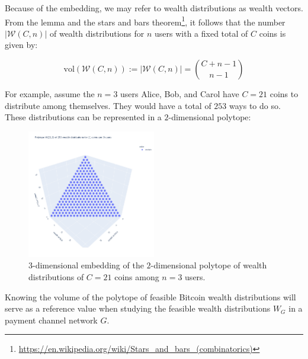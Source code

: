 \documentclass[10pt,twocolumn]{article}
\begin{document}


Because of the embedding, we may refer to wealth distributions as wealth vectors. From the lemma and the stars and bars theorem\footnote{\url{https://en.wikipedia.org/wiki/Stars_and_bars_(combinatorics)}}, it follows that the number \( |\mathcal{W}(C,n)| \) of wealth distributions for \( n \) users with a fixed total of \( C \) coins is given by:

\begin{equation}
\text{vol}(\mathcal{W}(C,n)) := |\mathcal{W}(C,n)| = \binom{C + n - 1}{n - 1}
\end{equation}

For example, assume the \( n=3 \) users Alice, Bob, and Carol have \( C=21 \) coins to distribute among themselves. They would have a total of \( 253 \) ways to do so. These distributions can be represented in a \( 2 \)-dimensional polytope:

\begin{figure}[h]
\centering
\includegraphics[width=0.5\textwidth]{polytope_of_bitcoin_wealth_distributions}
\caption{$3$-dimensional embedding of the $2$-dimensional polytope of wealth distributions of $C=21$ coins among $n=3$ users.}
\label{fig:wealthPolytope}
\end{figure}

Knowing the volume of the polytope of feasible Bitcoin wealth distributions will serve as a reference value when studying the feasible wealth distributions \( W_G \) in a payment channel network \( G \).
\end{document}
